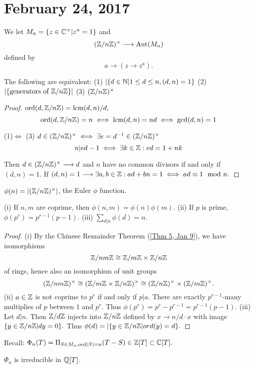 \section{February 24, 2017}

We let $M_n=\{z\in\mathbb{C}^{\times}|z^n=1\}$ and
$$(\mathbb{Z}/n\mathbb{Z})^{\times}\longrightarrow \operatorname{Aut}(M_n)$$ defined by
$$a\longrightarrow (z\longrightarrow z^a).$$

\begin{fact} \label{Fact 1, Feb 24}
The following are equivalent:
(1) $|\{d\in \mathbb{N} |1\leq d\leq n,(d,n)=1\}$
(2) $|\{\text{generators of }\mathbb{Z} / n \mathbb{Z}\}|$
(3) $(\mathbb{Z} / n \mathbb{Z})^{\times}$
\end{fact}
\begin{proof}
$\text{ord}(d,\mathbb{Z} / n \mathbb{Z})=\text{lcm}(d,n)/d,$
$$\text{ord}(d,\mathbb{Z} / n \mathbb{Z})=n\iff\text{lcm}(d,n)=nd\iff \text{gcd}(d,n)=1$$

(1)$\iff$ (3) $d\in (\mathbb{Z} / n \mathbb{Z})^{\times}\iff \exists e=d^{-1}\in (\mathbb{Z} / n \mathbb{Z} )^{\times}$
$$n|ed-1\iff\exists k\in \mathbb{Z} :ed=1+nk$$

Then $d\in(\mathbb{Z} / n \mathbb{Z})^{\times}\longrightarrow d$ and $n$ have no common divisors if and only if $(d,n)=1$. If $(d,n)=1\longrightarrow \exists a,b\in \mathbb{Z} :ad+bn=1\iff ad\equiv 1\mod n.$
\end{proof}
\begin{def} \label{Def 2, Feb 24}
$\phi(n)=|(\mathbb{Z} / n \mathbb{Z})^{\times}|$, the Euler $\phi$ function.
\end{def}
\begin{fact} \label{Fact 3, Feb 24}
(i) If $n,m$ are coprime, then $\phi(n,m)=\phi(n)\phi(m).$
(ii) If $p$ is prime, $\phi(p^r)=p^{r-1}(p-1).$
(iii) $\sum_{d|n}\phi(d)=n$.
\end{fact}
\begin{proof}
(i) By the Chinese Remainder Theorem (\ref{Thm 5, Jan 9}), we have isomorphisms
$$ \mathbb{Z} / nm \mathbb{Z} \cong \mathbb{Z} / m \mathbb{Z} \times \mathbb{Z} / n \mathbb{Z}$$
of rings, hence also an isomorphism of unit groups
$$(\mathbb{Z} / nm \mathbb{Z})^{\times}\cong (\mathbb{Z} / m \mathbb{Z} \times \mathbb{Z} / n \mathbb{Z})^{\times}\cong(\mathbb{Z} / n \mathbb{Z})^{\times}\times(\mathbb{Z} / m \mathbb{Z})^{\times}.$$
(ii) $a\in \mathbb{Z}$ is not coprime to $p^r$ if and only if $p|a$. There are exactly $p^{r-1}$-many multiplies of $p$ between $1$ and $p^r$. Thus $\phi(p^r)=p^r-p^{r-1}=p^{r-1}(p-1)$.
(iii) Let $d|n.$ Then $\mathbb{Z} / d \mathbb{Z}$ injects into $\mathbb{Z} / n \mathbb{Z}$ defined by $x\longrightarrow n/d\cdot x$ with image $\{y\in \mathbb{Z} / n \mathbb{Z}|dy=0\}.$ Thus $\phi(d)=|\{y\in \mathbb{Z} / n \mathbb{Z}|ord(y)=d\}.$
\end{proof}
Recall: $\Phi_n(T)=\Pi_{S\in M_n,\text{ord}(S)=n}(T-S)\in \mathbb{Z}[T]\subset \mathbb{C}[T].$
\begin{prop} \label{Prop 4, Feb 24}
$\Phi_n$ is irreducible in $\mathbb{Q}[T]$.
\end{prop}
